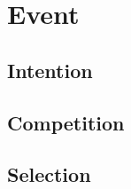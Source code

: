 \section{Event}

\subsection{Intention}

\subsection{Competition}

\subsection{Selection}
\label{subsec:selection}

